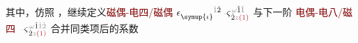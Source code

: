 其中，仿照 ，继续定义\textcolor{Maroon}{磁偶-电四/磁偶} $\epsilon^{\hphantom{\symup{\iota}}\mathcolor{gray}{\dot{1}}\dot{2}}_{\symup{\iota}} \Xint{\begin{smallmatrix} ~ \\ {}^{}_{\mathcolor{gray}{-}} \\ ~ \end{smallmatrix}}{13}{\varsigma}^{\;\! \mathcolor{gray}{\omega} \hat{1} \mathcolor{gray}{\check{1}}}_{\;\! \dot{2} \mathcolor{gray}{z} \textcolor{Maroon}{(1)}}$ 与下一阶 \textcolor{Maroon}{电偶-电八/磁四} $\Xint{\begin{smallmatrix} ~ \\ {}^{}_{\mathcolor{gray}{-}} \\ ~ \end{smallmatrix}}{13}{\varsigma}^{\;\! \mathcolor{gray}{\omega} \hat{1} \mathcolor{gray}{\check{1}} \mathcolor{gray}{\check{2}}}_{\;\! \dot{2} \mathcolor{gray}{z} \textcolor{Maroon}{(1)}}$ 合并同类项后的系数
